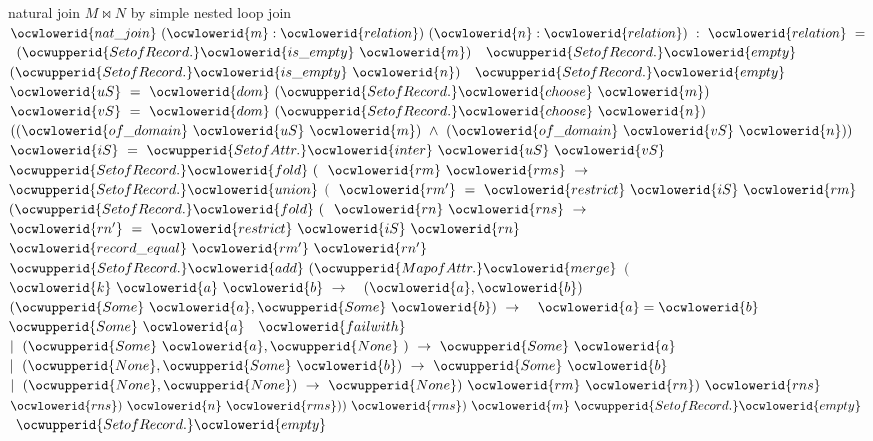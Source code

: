 \documentclass[12pt]{article}
\begin{document}
\ocwendcode{}\ocwindent{0.00em}
natural join $M \bowtie N$ by simple nested loop join 
\ocweol
\label{rellens.ml:1371}%
\medskip
\ocwbegincode{}\ocwindent{0.00em}
~$\ocwlowerid{nat\_join}~(\ocwlowerid{m}:\ocwlowerid{relation})~(\ocwlowerid{n}:\ocwlowerid{relation})~:~\ocwlowerid{relation}~=$\ocweol
\ocwindent{1.00em}
~$(\ocwupperid{SetofRecord.}\ocwlowerid{is\_empty}~\ocwlowerid{m})~$~$\ocwupperid{SetofRecord.}\ocwlowerid{empty}$\ocweol
\ocwindent{1.00em}
\ocweol
\ocwindent{2.00em}
~$(\ocwupperid{SetofRecord.}\ocwlowerid{is\_empty}~\ocwlowerid{n})~$~$\ocwupperid{SetofRecord.}\ocwlowerid{empty}$\ocweol
\ocwindent{2.00em}
\ocweol
\ocwindent{3.00em}
~$\ocwlowerid{uS}~=~\ocwlowerid{dom}~(\ocwupperid{SetofRecord.}\ocwlowerid{choose}~\ocwlowerid{m})~$\ocweol
\ocwindent{3.00em}
~$\ocwlowerid{vS}~=~\ocwlowerid{dom}~(\ocwupperid{SetofRecord.}\ocwlowerid{choose}~\ocwlowerid{n})~$\ocweol
\ocwindent{3.00em}
~$((\ocwlowerid{of\_domain}~\ocwlowerid{uS}~\ocwlowerid{m})~\land{}~(\ocwlowerid{of\_domain}~\ocwlowerid{vS}~\ocwlowerid{n}))$\ocweol
\ocwindent{3.00em}
\ocweol
\ocwindent{4.00em}
~$\ocwlowerid{iS}~=~\ocwupperid{SetofAttr.}\ocwlowerid{inter}~\ocwlowerid{uS}~\ocwlowerid{vS}~$\ocweol
\ocwindent{4.00em}
$\ocwupperid{SetofRecord.}\ocwlowerid{fold}~($~$\ocwlowerid{rm}~\ocwlowerid{rms}~\rightarrow{}$\ocweol
\ocwindent{5.00em}
$\ocwupperid{SetofRecord.}\ocwlowerid{union}$\ocweol
\ocwindent{5.00em}
$($~$\ocwlowerid{rm'}~=~\ocwlowerid{restrict}~\ocwlowerid{iS}~\ocwlowerid{rm}~$\ocweol
\ocwindent{5.00em}
$(\ocwupperid{SetofRecord.}\ocwlowerid{fold}~($~$\ocwlowerid{rn}~\ocwlowerid{rns}~\rightarrow{}$\ocweol
\ocwindent{6.00em}
~$\ocwlowerid{rn'}~=~\ocwlowerid{restrict}~\ocwlowerid{iS}~\ocwlowerid{rn}~$\ocweol
\ocwindent{6.00em}
~$\ocwlowerid{record\_equal}~\ocwlowerid{rm'}~\ocwlowerid{rn'}~$\ocweol
\ocwindent{6.00em}
~$\ocwupperid{SetofRecord.}\ocwlowerid{add}~(\ocwupperid{MapofAttr.}\ocwlowerid{merge}$\ocweol
\ocwindent{18.00em}
$($~$\ocwlowerid{k}~\ocwlowerid{a}~\ocwlowerid{b}~\rightarrow{}~$~$(\ocwlowerid{a},\ocwlowerid{b})~$\ocweol
\ocwindent{19.50em}
$(\ocwupperid{Some}~\ocwlowerid{a},\ocwupperid{Some}~\ocwlowerid{b})~\rightarrow{}~$~$\ocwlowerid{a}=\ocwlowerid{b}~$~$\ocwupperid{Some}~\ocwlowerid{a}~$~$\ocwlowerid{failwith}~$\ocweol
\ocwindent{18.50em}
$\mid{}~(\ocwupperid{Some}~\ocwlowerid{a},\ocwupperid{None}~)~\rightarrow{}~\ocwupperid{Some}~\ocwlowerid{a}$\ocweol
\ocwindent{18.50em}
$\mid{}~(\ocwupperid{None},\ocwupperid{Some}~\ocwlowerid{b})~\rightarrow{}~\ocwupperid{Some}~\ocwlowerid{b}$\ocweol
\ocwindent{18.50em}
$\mid{}~(\ocwupperid{None},\ocwupperid{None})~\rightarrow{}~\ocwupperid{None})~\ocwlowerid{rm}~\ocwlowerid{rn})~\ocwlowerid{rns}~$\ocweol
\ocwindent{6.00em}
~$\ocwlowerid{rns})~\ocwlowerid{n}~\ocwlowerid{rms}))~\ocwlowerid{rms})~\ocwlowerid{m}~\ocwupperid{SetofRecord.}\ocwlowerid{empty}~$\ocweol
\ocwindent{2.00em}
~$\ocwupperid{SetofRecord.}\ocwlowerid{empty}$\medskip
\end{document}
